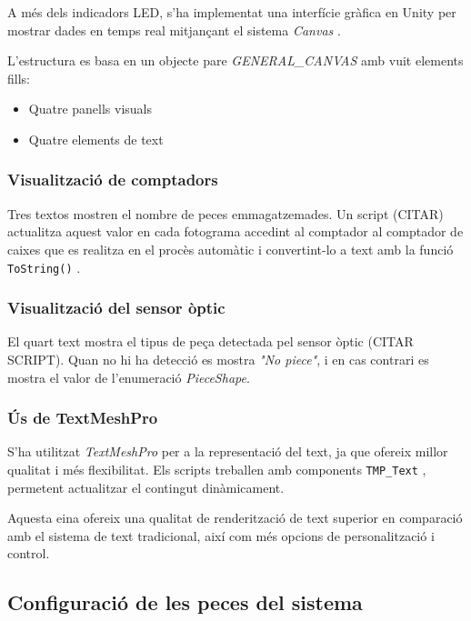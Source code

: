 \documentclass[12pt,a4paper]{report}
\begin{document}
A més dels indicadors LED, s'ha implementat una interfície gràfica en Unity per mostrar dades en temps real mitjançant el sistema \textit{Canvas} \cite{UnityCanvas}.

L'estructura es basa en un objecte pare \textit{GENERAL\_CANVAS} amb vuit elements fills:
\begin{itemize}
\item Quatre panells visuals
\item Quatre elements de text
\end{itemize}


\subsubsection{Visualització de comptadors}

Tres textos mostren el nombre de peces emmagatzemades. Un script (CITAR) actualitza aquest valor en cada fotograma accedint al comptador al comptador de caixes que es realitza en el procès automàtic i convertint-lo a text amb la funció \texttt{ToString()} \cite{dotnet_collections}.


\subsubsection{Visualització del sensor òptic}

El quart text mostra el tipus de peça detectada pel sensor òptic (CITAR SCRIPT). Quan no hi ha detecció es mostra \textit{"No piece"}, i en cas contrari es mostra el valor de l'enumeració \textit{PieceShape}.


\subsubsection{Ús de TextMeshPro}

S'ha utilitzat \textit{TextMeshPro} per a la representació del text, ja que ofereix millor qualitat i més flexibilitat. Els scripts treballen amb components \texttt{TMP\_Text} \cite{dotnet_text}, permetent actualitzar el contingut dinàmicament. 

Aquesta eina ofereix una qualitat de renderització de text superior en comparació amb el sistema de text tradicional, així com més opcions de personalització i control.


\subsection{Configuració de les peces del sistema}
\end{document}
